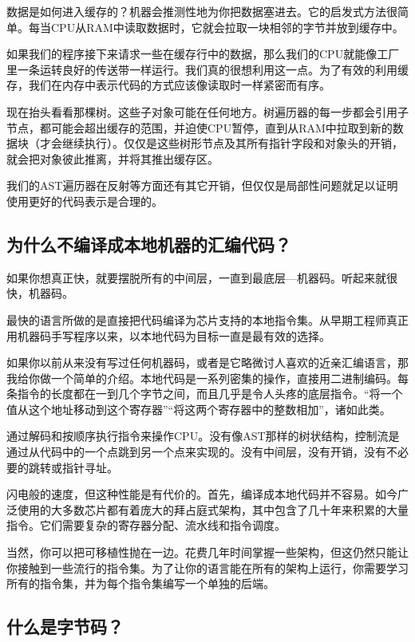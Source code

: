 \documentclass[cn,11pt,chinese]{elegantbook}
\begin{document}
数据是如何进入缓存的？机器会推测性地为你把数据塞进去。它的启发式方法很简单。每当CPU从RAM中读取数据时，它就会拉取一块相邻的字节并放到缓存中。

如果我们的程序接下来请求一些在缓存行中的数据，那么我们的CPU就能像工厂里一条运转良好的传送带一样运行。我们真的很想利用这一点。为了有效的利用缓存，我们在内存中表示代码的方式应该像读取时一样紧密而有序。

现在抬头看看那棵树。这些子对象可能在任何地方。树遍历器的每一步都会引用子节点，都可能会超出缓存的范围，并迫使CPU暂停，直到从RAM中拉取到新的数据块（才会继续执行）。仅仅是这些树形节点及其所有指针字段和对象头的开销，就会把对象彼此推离，并将其推出缓存区。

我们的AST遍历器在反射等方面还有其它开销，但仅仅是局部性问题就足以证明使用更好的代码表示是合理的。

\subsection{为什么不编译成本地机器的汇编代码？}

如果你想真正快，就要摆脱所有的中间层，一直到最底层—机器码。听起来就很快，机器码。

最快的语言所做的是直接把代码编译为芯片支持的本地指令集。从早期工程师真正用机器码手写程序以来，以本地代码为目标一直是最有效的选择。

如果你以前从来没有写过任何机器码，或者是它略微讨人喜欢的近亲汇编语言，那我给你做一个简单的介绍。本地代码是一系列密集的操作，直接用二进制编码。每条指令的长度都在一到几个字节之间，而且几乎是令人头疼的底层指令。“将一个值从这个地址移动到这个寄存器”“将这两个寄存器中的整数相加”，诸如此类。

通过解码和按顺序执行指令来操作CPU。没有像AST那样的树状结构，控制流是通过从代码中的一个点跳到另一个点来实现的。没有中间层，没有开销，没有不必要的跳转或指针寻址。

闪电般的速度，但这种性能是有代价的。首先，编译成本地代码并不容易。如今广泛使用的大多数芯片都有着庞大的拜占庭式架构，其中包含了几十年来积累的大量指令。它们需要复杂的寄存器分配、流水线和指令调度。

当然，你可以把可移植性抛在一边。花费几年时间掌握一些架构，但这仍然只能让你接触到一些流行的指令集。为了让你的语言能在所有的架构上运行，你需要学习所有的指令集，并为每个指令集编写一个单独的后端。

\subsection{什么是字节码？}
\end{document}
